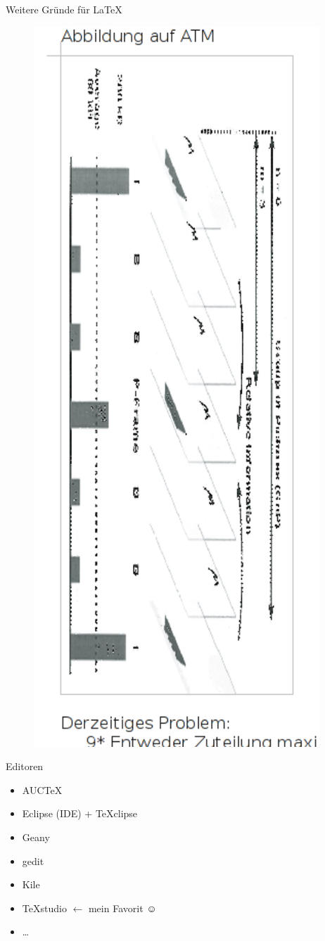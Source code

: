 \begin{frame}{Weitere Gründe für \LaTeX}
\begin{figure}[tbph]
\centering
\includegraphics[height=0.75\textheight]{./pictures/hoeller3}
\label{fig:hoeller3}
\end{figure}
\end{frame}

\begin{frame}{Editoren}
 \begin{itemize}
 	\item AUCTeX
 	\item Eclipse (IDE) + TeXclipse
 	\item Geany
 	\item gedit
 	\item Kile
 	\item TeXstudio $ \leftarrow $ mein Favorit $\smiley$
 	\item \ldots
 \end{itemize}

\end{frame}